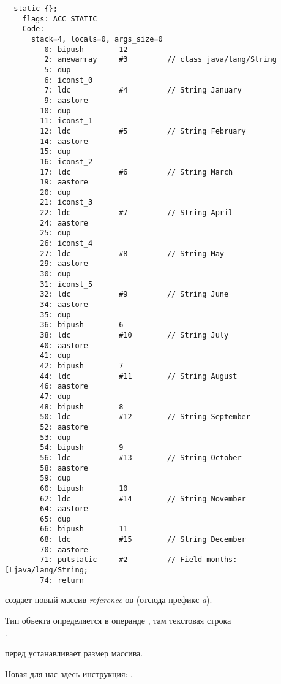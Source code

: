 \begin{lstlisting}
  static {};
    flags: ACC_STATIC
    Code:
      stack=4, locals=0, args_size=0
         0: bipush        12
         2: anewarray     #3         // class java/lang/String
         5: dup           
         6: iconst_0      
         7: ldc           #4         // String January
         9: aastore       
        10: dup           
        11: iconst_1      
        12: ldc           #5         // String February
        14: aastore       
        15: dup           
        16: iconst_2      
        17: ldc           #6         // String March
        19: aastore       
        20: dup           
        21: iconst_3      
        22: ldc           #7         // String April
        24: aastore       
        25: dup           
        26: iconst_4      
        27: ldc           #8         // String May
        29: aastore       
        30: dup           
        31: iconst_5      
        32: ldc           #9         // String June
        34: aastore       
        35: dup           
        36: bipush        6
        38: ldc           #10        // String July
        40: aastore       
        41: dup           
        42: bipush        7
        44: ldc           #11        // String August
        46: aastore       
        47: dup           
        48: bipush        8
        50: ldc           #12        // String September
        52: aastore       
        53: dup           
        54: bipush        9
        56: ldc           #13        // String October
        58: aastore       
        59: dup           
        60: bipush        10
        62: ldc           #14        // String November
        64: aastore       
        65: dup           
        66: bipush        11
        68: ldc           #15        // String December
        70: aastore       
        71: putstatic     #2         // Field months:[Ljava/lang/String;
        74: return        
\end{lstlisting}


 создает новый массив \emph{reference}-ов (отсюда префикс \emph{a}).

Тип объекта определяется в операнде , там текстовая строка \\
.

 перед  устанавливает размер массива.

Новая для нас здесь инструкция: .



